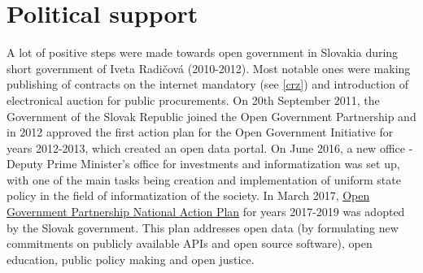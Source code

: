 \documentclass[thesis=B,english]{FITthesis}[2012/06/26]
\begin{document}
	\section{Political support}
	A lot of positive steps were made towards open government in Slovakia during short government of Iveta Radičová (2010-2012). Most notable ones were making publishing of contracts on the internet mandatory (see \ref{crz}) and introduction of electronical auction for public procurements. On 20th September 2011, the Government of the Slovak Republic joined the Open Government Partnership and in 2012 approved the first  action plan for the Open Government Initiative for years 2012-2013, which created an open data portal. On June 2016, a new  office - Deputy Prime Minister's office for investments and informatization was set up, with one of the main tasks being creation and implementation of uniform state policy in the field of informatization of the society. In March 2017, \href{https://www.opengovpartnership.org/sites/default/files/Slovakia_NAP_2017-2019_EN.pdf}{Open Government Partnership National Action Plan} for years 2017-2019 was adopted by the Slovak government. This plan addresses open data (by formulating new commitments on publicly available APIs and open source software), open education, public policy making and open justice.
\end{document}
